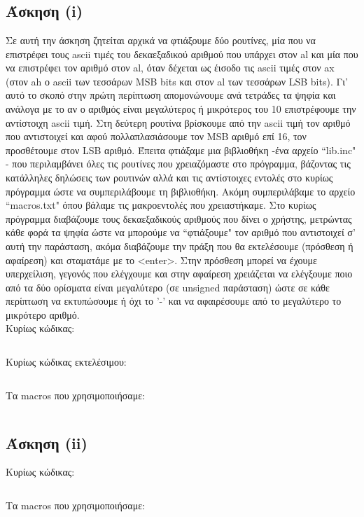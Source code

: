 \documentclass[a4paper,10pt]{article} \usepackage{anysize}
\begin{document}


\section*{} 
\subsection*{Άσκηση (i)}
Σε αυτή την άσκηση ζητείται αρχικά να φτιάξουμε δύο ρουτίνες, μία που να
επιστρέφει τους ascii τιμές του δεκαεξαδικού αριθμού που υπάρχει στον al και
μία που να επιστρέφει τον αριθμό στον al, όταν δέχεται ως έισοδο τις ascii
τιμές στον ax (στον ah ο ascii των τεσσάρων MSB bits και στον al των τεσσάρων
LSB bits). Γι' αυτό το σκοπό στην πρώτη περίπτωση απομονώνουμε ανά τετράδες τα
ψηφία και ανάλογα με το αν ο αριθμός είναι μεγαλύτερος ή μικρότερος του 10
επιστρέφουμε την αντίστοιχη ascii τιμή. Στη δεύτερη ρουτίνα βρίσκουμε από την
ascii τιμή τον αριθμό που αντιστοιχεί και αφού πολλαπλασιάσουμε τον MSB αριθμό
επί 16, τον προσθέτουμε στον LSB αριθμό. Έπειτα φτιάξαμε μια βιβλιοθήκη -ένα
αρχείο ``lib.inc" - που περιλαμβάνει όλες τις ρουτίνες που χρειαζόμαστε στο
πρόγραμμα, βάζοντας τις κατάλληλες δηλώσεις των ρουτινών αλλά και τις
αντίστοιχες εντολές στο κυρίως πρόγραμμα ώστε να συμπεριλάβουμε τη βιβλιοθήκη.
Ακόμη συμπεριλάβαμε το αρχείο ``macros.txt" όπου βάλαμε τις μακροεντολές
που χρειαστήκαμε.  Στο κυρίως πρόγραμμα διαβάζουμε τους δεκαεξαδικούς αριθμούς
που δίνει ο χρήστης, μετρώντας κάθε φορά τα ψηφία ώστε να μπορούμε να
``φτιάξουμε" τον αριθμό που αντιστοιχεί σ' αυτή την παράσταση, ακόμα διαβάζουμε
την πράξη που θα εκτελέσουμε (πρόσθεση ή αφαίρεση) και σταματάμε με το
<enter>. Στην πρόσθεση μπορεί να έχουμε υπερχείλιση, γεγονός που ελέγχουμε και
στην αφαίρεση χρειάζεται να ελέγξουμε ποιο από τα δύο ορίσματα είναι
μεγαλύτερο (σε unsigned παράσταση) ώστε σε κάθε περίπτωση να εκτυπώσουμε ή όχι
το '-' και να αφαιρέσουμε από το μεγαλύτερο το μικρότερο αριθμό.\\[0.5cm]

\noindent Κυρίως κώδικας:
\inputminted[linenos,obeytabs,fontsize=\footnotesize]{nasm}{files/lib.inc}
\noindent Κυρίως κώδικας εκτελέσιμου:
\inputminted[linenos,obeytabs,fontsize=\footnotesize]{nasm}{files/1.asm}
\noindent Τα macros που χρησιμοποιήσαμε:
\inputminted[linenos,obeytabs,fontsize=\footnotesize]{nasm}{files/1.txt}
\subsection*{Άσκηση (ii)}

\noindent Κυρίως κώδικας:
\inputminted[linenos,obeytabs,fontsize=\footnotesize]{nasm}{files/2.asm}
Τα macros που χρησιμοποιήσαμε:
\inputminted[linenos,obeytabs,fontsize=\footnotesize]{nasm}{files/2.txt}
\end{document}
